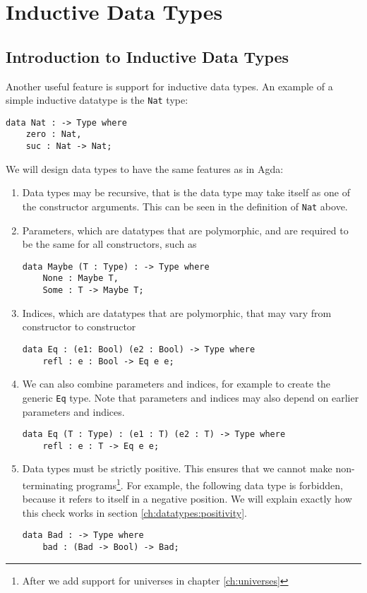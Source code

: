 \chapter{Inductive Data Types}
\label{ch:datatypes}

\section{Introduction to Inductive Data Types}
\label{ch:datatypes:intro}

Another useful feature is support for inductive data types. An example of a simple inductive datatype is the \verb|Nat| type:
\begin{lstlisting}
data Nat : -> Type where
    zero : Nat,
    suc : Nat -> Nat;
\end{lstlisting}
We will design data types to have the same features as in Agda:
\begin{enumerate}
\item Data types may be recursive, that is the data type may take itself as one of the constructor arguments. This can be seen in the definition of \verb|Nat| above.
\item Parameters, which are datatypes that are polymorphic, and are required to be the same for all constructors, such as
\begin{lstlisting}
data Maybe (T : Type) : -> Type where
    None : Maybe T,
    Some : T -> Maybe T;
\end{lstlisting}
\item Indices, which are datatypes that are polymorphic, that may vary from constructor to constructor
\begin{lstlisting}
data Eq : (e1: Bool) (e2 : Bool) -> Type where
    refl : e : Bool -> Eq e e;
\end{lstlisting}
\item We can also combine parameters and indices, for example to create the generic \verb|Eq| type. Note that parameters and indices may also depend on earlier parameters and indices.
\begin{lstlisting}
data Eq (T : Type) : (e1 : T) (e2 : T) -> Type where
    refl : e : T -> Eq e e;
\end{lstlisting}
\item Data types must be strictly positive. This ensures that we cannot make non-terminating programs\footnote{After we add support for universes in chapter \ref{ch:universes}}. For example, the following data type is forbidden, because it refers to itself in a negative position. We will explain exactly how this check works in section \ref{ch:datatypes:positivity}.
\begin{lstlisting}
data Bad : -> Type where
	bad : (Bad -> Bool) -> Bad;
\end{lstlisting}
\end{enumerate}

